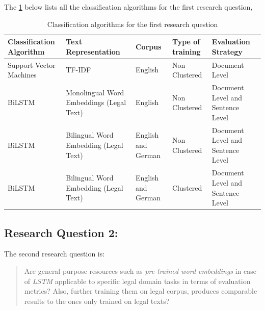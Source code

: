 The \ref{table:ListQuestionFirstQuestion} below lists all the classification algorithms for the first research question,

\clearpage

\begin{table}[!ht]
\centering
\begin{tabular}{>{\centering\arraybackslash}m{3cm}>{\centering\arraybackslash}m{3cm}>{\centering\arraybackslash}m{1.5cm}>{\centering\arraybackslash}m{2.3cm}>{\centering\arraybackslash}m{3cm}}
\hline
\textbf{Classification Algorithm} & \textbf{Text Representation} & \textbf{Corpus} & \textbf{Type of training} & \textbf{Evaluation Strategy} \\ [0.2cm]\hline
Support Vector Machines & \gls{TF-IDF} & English & Non Clustered & Document Level \\[0.3cm]
\gls{BiLSTM} & Monolingual Word Embeddings (Legal Text) & English & Non Clustered & Document Level and Sentence Level \\[0.3cm]
\gls{BiLSTM} & Bilingual Word Embedding (Legal Text) & English and German & Non Clustered & Document Level and Sentence Level \\[0.3cm]
\gls{BiLSTM} & Bilingual Word Embedding (Legal Text) & English and German & Clustered & Document Level and Sentence Level \\ \hline
\end{tabular}
\caption{Classification algorithms for the first research question}
\label{table:ListQuestionFirstQuestion}
\end{table}



\subsection{Research Question 2:} \label{question2}
The second research question is:

\begin{quote}
    Are general-purpose resources such as \textit{pre-trained word embeddings} in case of \textit{LSTM} applicable to specific legal domain tasks in terms of evaluation metrics? Also, further training them on legal corpus, produces comparable results to the ones only trained on legal texts?
\end{quote}

